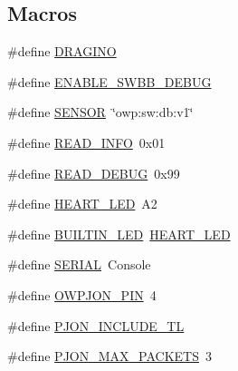 \subsection*{Macros}
\begin{DoxyCompactItemize}
\item 
\#define \hyperlink{BlinkingSwitch__SWBB-TL__semitransparent_8ino_ade5c854545f689359e3c93af0816012f}{D\-R\-A\-G\-I\-N\-O}
\item 
\#define \hyperlink{BlinkingSwitch__SWBB-TL__semitransparent_8ino_afe7c01ec8464853a8b557e136e9bd4d5}{E\-N\-A\-B\-L\-E\-\_\-\-S\-W\-B\-B\-\_\-\-D\-E\-B\-U\-G}
\item 
\#define \hyperlink{BlinkingSwitch__SWBB-TL__semitransparent_8ino_a84f1ead330bbcc83a63929c4726080d7}{S\-E\-N\-S\-O\-R}~\char`\"{}owp\-:sw\-:db\-:v1\char`\"{}
\item 
\#define \hyperlink{BlinkingSwitch__SWBB-TL__semitransparent_8ino_ae9d85efda88bdfdba5ca9fe92f557dd9}{R\-E\-A\-D\-\_\-\-I\-N\-F\-O}~0x01
\item 
\#define \hyperlink{BlinkingSwitch__SWBB-TL__semitransparent_8ino_a5e0a7e710138136020c1614624faf0a1}{R\-E\-A\-D\-\_\-\-D\-E\-B\-U\-G}~0x99
\item 
\#define \hyperlink{BlinkingSwitch__SWBB-TL__semitransparent_8ino_ab5e96fdebe625793e8ec86ab6b5d9043}{H\-E\-A\-R\-T\-\_\-\-L\-E\-D}~A2
\item 
\#define \hyperlink{BlinkingSwitch__SWBB-TL__semitransparent_8ino_a4a71aecac635579082c10addb16df4a0}{B\-U\-I\-L\-T\-I\-N\-\_\-\-L\-E\-D}~\hyperlink{Yun__Dragino__Server__LoRa__WAN__RTOS_8ino_ab5e96fdebe625793e8ec86ab6b5d9043}{H\-E\-A\-R\-T\-\_\-\-L\-E\-D}
\item 
\#define \hyperlink{BlinkingSwitch__SWBB-TL__semitransparent_8ino_aae3f0b4211ba45d265973d40ccbb5fd1}{S\-E\-R\-I\-A\-L}~Console
\item 
\#define \hyperlink{BlinkingSwitch__SWBB-TL__semitransparent_8ino_a34fea28a7531677453da5e072f172a78}{O\-W\-P\-J\-O\-N\-\_\-\-P\-I\-N}~4
\item 
\#define \hyperlink{BlinkingSwitch__SWBB-TL__semitransparent_8ino_aeebf956fc71944a6237c3af6a038ff70}{P\-J\-O\-N\-\_\-\-I\-N\-C\-L\-U\-D\-E\-\_\-\-T\-L}
\item 
\#define \hyperlink{BlinkingSwitch__SWBB-TL__semitransparent_8ino_af093da5eac99580be6ba61b4dc79f2c1}{P\-J\-O\-N\-\_\-\-M\-A\-X\-\_\-\-P\-A\-C\-K\-E\-T\-S}~3
\end{DoxyCompactItemize}
